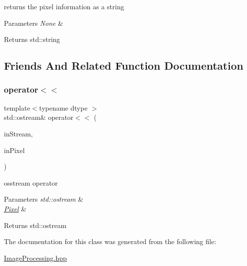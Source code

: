 returns the pixel information as a string


\begin{DoxyParams}{Parameters}
{\em None} & \\
\hline
\end{DoxyParams}
\begin{DoxyReturn}{Returns}
std\+::string 
\end{DoxyReturn}


\subsection{Friends And Related Function Documentation}
\mbox{\label{class_num_c_1_1_image_processing_1_1_pixel_ab2651c4b29062ba3676ace1dde6ad93d}} 
\subsubsection{\texorpdfstring{operator$<$$<$}{operator<<}}
{\footnotesize\ttfamily template$<$typename dtype $>$ \\
std\+::ostream\& operator$<$$<$ (\begin{DoxyParamCaption}\item[{std\+::ostream \&}]{in\+Stream,  }\item[{const \mbox{\hyperlink{class_num_c_1_1_image_processing_1_1_pixel}{Pixel}} \&}]{in\+Pixel }\end{DoxyParamCaption})\hspace{0.3cm}{\ttfamily [friend]}}

osstream operator


\begin{DoxyParams}{Parameters}
{\em std\+::ostream} & \\
\hline
{\em \mbox{\hyperlink{class_num_c_1_1_image_processing_1_1_pixel}{Pixel}}} & \\
\hline
\end{DoxyParams}
\begin{DoxyReturn}{Returns}
std\+::ostream 
\end{DoxyReturn}


The documentation for this class was generated from the following file\+:\begin{DoxyCompactItemize}
\item 
\mbox{\hyperlink{_image_processing_8hpp}{Image\+Processing.\+hpp}}\end{DoxyCompactItemize}
